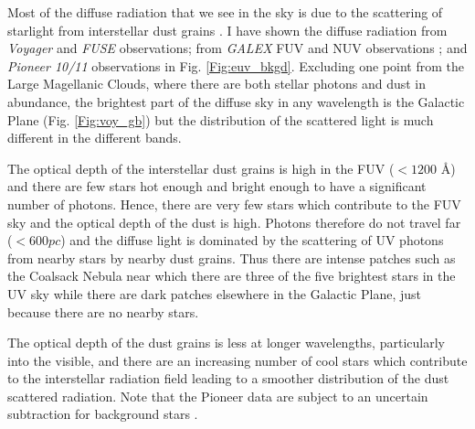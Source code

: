 \documentclass{iau}
\newcommand{\galex}{{\it GALEX }}
\begin{document}
Most of the diffuse radiation that we see in the sky is due to the scattering of starlight from interstellar dust grains \citep{Jura1979}. I have shown the diffuse radiation from {\it Voyager} \citep{Murthyvoy_all} and {\it FUSE} \citep{Murthy_sahnow2004} observations; from \galex FUV and NUV observations \citep{Murthy2014apj}; and {\it Pioneer 10/11} observations \citep{Gordon_Pioneer1998} in Fig. \ref{Fig:euv_bkgd}. Excluding one point from the Large Magellanic Clouds, where there are both stellar photons and dust in abundance, the brightest part of the diffuse sky in any wavelength is the Galactic Plane (Fig. \ref{Fig:voy_gb}) but the distribution of the scattered light is much different in the different bands.

The optical depth of the interstellar dust grains is high in the FUV ($< 1200$ \AA) \citep{Draine_scat2003} and there are few stars hot enough \citep{Murthy_model1995} and bright enough to have a significant number of photons. Hence, there are very few stars which contribute to the FUV sky and the optical depth of the dust is high. Photons therefore do not travel far ($< 600 pc$) and the diffuse light is dominated by the scattering of UV photons from nearby stars by nearby dust grains. Thus there are intense patches such as the Coalsack Nebula near which there are three of the five brightest stars in the UV sky \citep{Murthy_CS1994} while there are dark patches elsewhere in the Galactic Plane, just because there are no nearby stars. 

The optical depth of the dust grains is less at longer wavelengths, particularly into the visible, and there are an increasing number of cool stars which contribute to the interstellar radiation field leading to a smoother distribution of the dust scattered radiation. Note that the Pioneer data are subject to an uncertain subtraction for background stars \citep{Toller_EBL}. 
\end{document}
